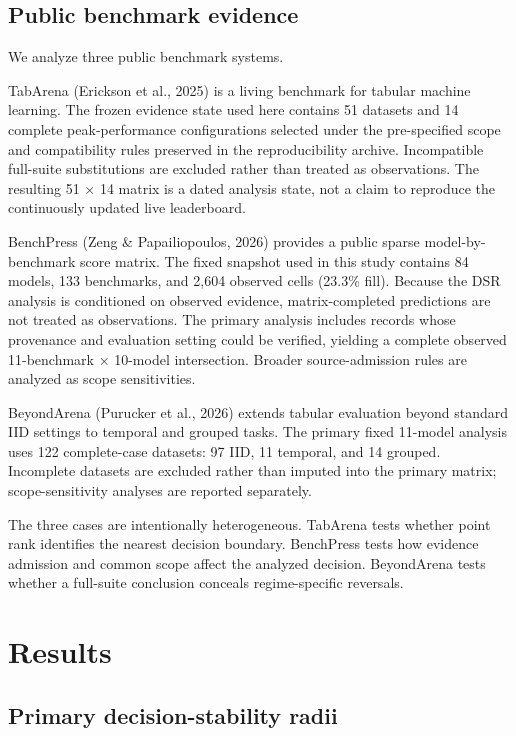 \documentclass[11pt]{article}
\begin{document}
\subsection{Public benchmark evidence}

We analyze three public benchmark systems.

TabArena (Erickson et al., 2025) is a living benchmark for tabular machine learning. The frozen evidence state used here contains 51 datasets and 14 complete peak-performance configurations selected under the pre-specified scope and compatibility rules preserved in the reproducibility archive. Incompatible full-suite substitutions are excluded rather than treated as observations. The resulting 51 × 14 matrix is a dated analysis state, not a claim to reproduce the continuously updated live leaderboard.

BenchPress (Zeng \& Papailiopoulos, 2026) provides a public sparse model-by-benchmark score matrix. The fixed snapshot used in this study contains 84 models, 133 benchmarks, and 2,604 observed cells (23.3\% fill). Because the DSR analysis is conditioned on observed evidence, matrix-completed predictions are not treated as observations. The primary analysis includes records whose provenance and evaluation setting could be verified, yielding a complete observed 11-benchmark × 10-model intersection. Broader source-admission rules are analyzed as scope sensitivities.

BeyondArena (Purucker et al., 2026) extends tabular evaluation beyond standard IID settings to temporal and grouped tasks. The primary fixed 11-model analysis uses 122 complete-case datasets: 97 IID, 11 temporal, and 14 grouped. Incomplete datasets are excluded rather than imputed into the primary matrix; scope-sensitivity analyses are reported separately.

The three cases are intentionally heterogeneous. TabArena tests whether point rank identifies the nearest decision boundary. BenchPress tests how evidence admission and common scope affect the analyzed decision. BeyondArena tests whether a full-suite conclusion conceals regime-specific reversals.

\section{Results}

\subsection{Primary decision-stability radii}
\end{document}
